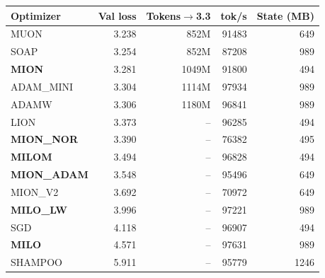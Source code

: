 \begin{tabular}{lrrrr}
\toprule
Optimizer & Val loss & Tokens$\to$3.3 & tok/s & State (MB) \\
\midrule
MUON & 3.238 & 852M & 91483 & 649 \\
SOAP & 3.254 & 852M & 87208 & 989 \\
\textbf{MION} & 3.281 & 1049M & 91800 & 494 \\
ADAM\_MINI & 3.304 & 1114M & 97934 & 989 \\
ADAMW & 3.306 & 1180M & 96841 & 989 \\
LION & 3.373 & -- & 96285 & 494 \\
\textbf{MION\_NOR} & 3.390 & -- & 76382 & 495 \\
\textbf{MILOM} & 3.494 & -- & 96828 & 494 \\
\textbf{MION\_ADAM} & 3.548 & -- & 95496 & 649 \\
MION\_V2 & 3.692 & -- & 70972 & 649 \\
\textbf{MILO\_LW} & 3.996 & -- & 97221 & 989 \\
SGD & 4.118 & -- & 96907 & 494 \\
\textbf{MILO} & 4.571 & -- & 97631 & 989 \\
SHAMPOO & 5.911 & -- & 95779 & 1246 \\
\bottomrule
\end{tabular}